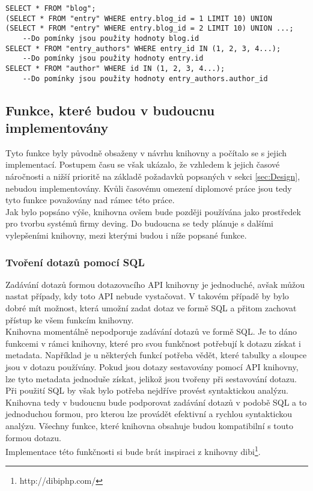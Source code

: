 \documentclass[ing,male,java,dept456]{diploma}						%
\begin{document}
\begin{lstlisting}[style=customsql, label=src:sql-selectin, caption={Dotazy vygenerované výpisem \ref{src:imp-selectin}}]
SELECT * FROM "blog";
(SELECT * FROM "entry" WHERE entry.blog_id = 1 LIMIT 10) UNION  (SELECT * FROM "entry" WHERE entry.blog_id = 2 LIMIT 10) UNION ...; 
	--Do pomínky jsou použity hodnoty blog.id
SELECT * FROM "entry_authors" WHERE entry_id IN (1, 2, 3, 4...); 
	--Do pomínky jsou použity hodnoty entry.id
SELECT * FROM "author" WHERE id IN (1, 2, 3, 4...);
	--Do pomínky jsou použity hodnoty entry_authors.author_id
\end{lstlisting}

\subsection{Funkce, které budou v budoucnu implementovány}

Tyto funkce byly původně obsaženy v návrhu knihovny a počítalo se s jejich implementací. Postupem času se však ukázalo, že vzhledem k jejich časové náročnosti a nižší prioritě na základě požadavků popsaných v sekci \ref{sec:Design}, nebudou implementovány. Kvůli časovému omezení diplomové práce jsou tedy tyto funkce považovány nad rámec této práce. \\
Jak bylo popsáno výše, knihovna ovšem bude později používána jako prostředek pro tvorbu systémů firmy deving. Do budoucna se tedy plánuje s dalšími vylepšeními knihovny, mezi kterými budou i níže popsané funkce.

\subsubsection{Tvoření dotazů pomocí SQL}

Zadávání dotazů formou dotazovacího API knihovny je jednoduché, avšak můžou nastat případy, kdy toto API nebude vystačovat. V takovém případě by bylo dobré mít možnost, která umožní zadat dotaz ve formě SQL a přitom zachovat přístup ke všem funkcím  knihovny. \\
Knihovna momentálně nepodporuje zadávání dotazů ve formě SQL. Je to dáno funkcemi v rámci knihovny, které pro svou funkčnost potřebují k dotazu získat i metadata. Například je u některých funkcí potřeba vědět, které tabulky a sloupce jsou v dotazu používány. Pokud jsou dotazy sestavovány pomocí API knihovny, lze tyto metadata jednoduše získat, jelikož jsou tvořeny při sestavování dotazu. Při použití SQL by však bylo potřeba nejdříve provést syntaktickou analýzu. \\
Knihovna tedy v budoucnu bude podporovat zadávání dotazů v podobě SQL a to jednoduchou formou, pro kterou lze provádět efektivní a rychlou syntaktickou analýzu. Všechny funkce, které knihovna obsahuje budou kompatibilní s touto formou dotazu. \\
Implementace této funkčnosti si bude brát inspiraci z knihovny dibi\footnote{http://dibiphp.com/}.
\end{document}
